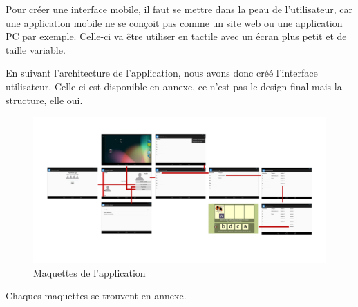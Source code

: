 Pour créer une interface mobile, il faut se mettre dans la peau de l'utilisateur, car une application mobile ne se conçoit pas comme un site web ou une application PC par exemple. Celle-ci va être utiliser en tactile avec un écran plus petit et de taille variable.


En suivant l'architecture de l'application, nous avons donc créé l'interface utilisateur. Celle-ci est disponible en annexe, ce n'est pas le design final mais la structure, elle oui.

\begin{figure}[H]
\begin{center}
\includegraphics[width=20cm,angle=90]{images/pepit_wireframe}
\end{center}
\caption{Maquettes de l'application}
\label{Maquettes de l'application}
\end{figure}

Chaques maquettes se trouvent en annexe.
